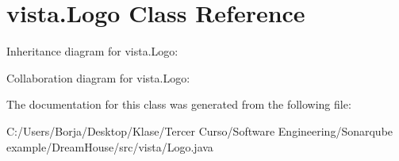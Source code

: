 \hypertarget{classvista_1_1_logo}{}\section{vista.\+Logo Class Reference}
\label{classvista_1_1_logo}


Inheritance diagram for vista.\+Logo\+:


Collaboration diagram for vista.\+Logo\+:


The documentation for this class was generated from the following file\+:\begin{DoxyCompactItemize}
\item 
C\+:/\+Users/\+Borja/\+Desktop/\+Klase/\+Tercer Curso/\+Software Engineering/\+Sonarqube example/\+Dream\+House/src/vista/Logo.\+java\end{DoxyCompactItemize}
